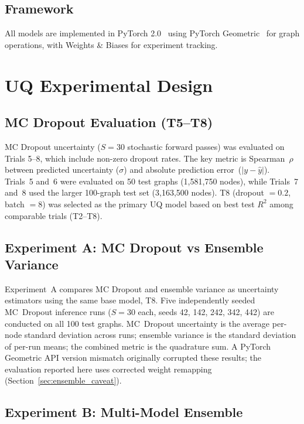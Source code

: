 \subsection{Framework}

All models are implemented in PyTorch 2.0~\cite{paszke2019pytorch} using PyTorch Geometric~\cite{fey2019fast} for graph operations, with Weights \& Biases for experiment tracking.

\section{UQ Experimental Design}

\subsection{MC Dropout Evaluation (T5--T8)}

MC Dropout uncertainty ($S = 30$ stochastic forward passes) was evaluated on Trials 5--8, which include non-zero dropout rates. The key metric is Spearman~$\rho$ between predicted uncertainty ($\sigma$) and absolute prediction error~($|y - \hat{y}|$). Trials~5 and~6 were evaluated on 50 test graphs (1,581,750 nodes), while Trials~7 and~8 used the larger 100-graph test set (3,163,500 nodes). T8 (dropout $= 0.2$, batch $= 8$) was selected as the primary UQ model based on best test $R^2$ among comparable trials (T2--T8).

\subsection{Experiment A: MC Dropout vs Ensemble Variance}

Experiment~A compares MC Dropout and ensemble variance as uncertainty estimators using the same base model, T8. Five independently seeded MC~Dropout inference runs ($S = 30$ each, seeds 42, 142, 242, 342, 442) are conducted on all 100 test graphs.  MC~Dropout uncertainty is the average per-node standard deviation across runs; ensemble variance is the standard deviation of per-run means; the combined metric is the quadrature sum.  A PyTorch Geometric API version mismatch originally corrupted these results; the evaluation reported here uses corrected weight remapping (Section~\ref{sec:ensemble_caveat}).

\subsection{Experiment B: Multi-Model Ensemble}

